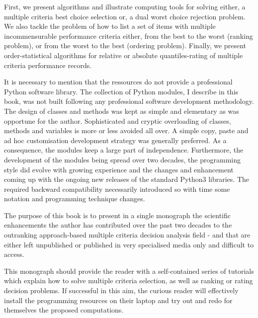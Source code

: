 First, we present algorithms and illustrate computing tools for solving either, a multiple criteria best choice selection or, a dual worst choice rejection problem. We also tackle the problem of how to list a set of items with multiple incommensurable performance criteria either, from the best to the worst (ranking problem), or from the worst to the best (ordering problem). Finally, we present order-statistical algorithms for relative or absolute quantiles-rating of multiple criteria performance records.

It is necessary to mention that the \Digraph ressources do not provide a professional Python software library. The collection of Python modules, I describe in this book, was not built following any professional software development methodology. The design of classes and methods was kept as simple and elementary as was opportune for the author. Sophisticated and cryptic overloading of classes, methods and variables is more or less avoided all over. A simple copy, paste and ad hoc customisation development strategy was generally preferred. As a consequence, the \Digraph modules keep a large part of independence.  Furthermore, the development of the \Digraph modules being spread over two decades, the programming style did evolve with growing experience and the changes and enhancement coming up with the ongoing new releases of the standard Python3 libraries. The required backward compatibility necessarily introduced so with time some notation and programming technique changes.


The purpose of this book is to present in a single monograph the scientific enhancements the author has contributed over the past two decades to the outranking approach-based multiple criteria decision analysis field - and that are either left unpublished or published in very specialised media only and difficult to access.  


This monograph should provide the reader with a self-contained series of tutorials which explain how to solve multiple criteria selection, as well as ranking or rating decision problems. If successful in this aim, the curious reader will effectively install the \Digraph programming resources on their laptop and try out and redo for themselves the proposed computations.

